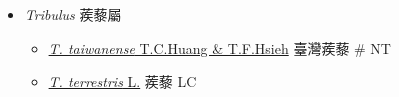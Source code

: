 
  \begin{itemize}
 \item[] \textit{Tribulus} 蒺藜屬
                                
  \begin{itemize}
        \item[] \href{http://www.theplantlist.org/tpl1.1/search?q=Tribulus+taiwanense}{\textit{T. taiwanense} T.C.Huang \& T.F.Hsieh}   臺灣蒺藜  \# NT
        \item[] \href{http://www.theplantlist.org/tpl1.1/search?q=Tribulus+terrestris}{\textit{T. terrestris} L.}   蒺藜   LC
  \end{itemize}
  \end{itemize}
